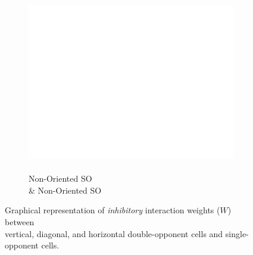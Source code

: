 \documentclass[journal,onecolumn]{IEEEtran}
\begin{document}
{\begin{figure}
\begin{subfigure}[b]{0.2\textwidth}
            \captionsetup{justification=centering}
            \includegraphics[width=.85\linewidth]{map-w_blank}
            \caption{\\ Non-Oriented SO \\ \& Non-Oriented SO}
    \end{subfigure}%
    \caption{Graphical representation of \textit{inhibitory} interaction weights ($W$) between\\ vertical, diagonal, and horizontal double-opponent cells and single-opponent cells.}
\end{figure}
\clearpage
}

\end{document}
